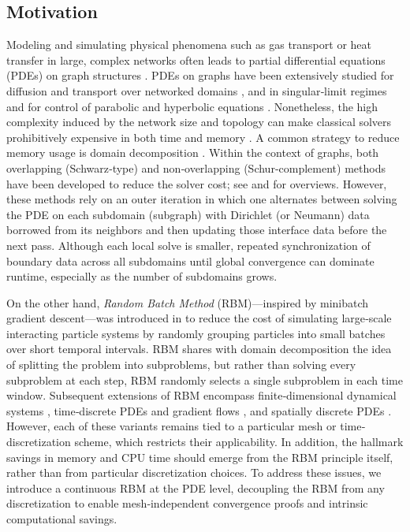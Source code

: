 \documentclass[10pt,a4paper]{amsart}
\begin{document}
\subsection{Motivation}
Modeling and simulating physical phenomena such as gas transport or heat transfer in large, complex networks often leads to partial differential equations (PDEs) on graph structures \cite{MR3728372,Leuge,Mugnolo,wad1}. PDEs on graphs have been extensively studied for diffusion and transport over networked domains \cite{Leuge,Mugnolo,wad1,wad3,MR2818413}, and in singular‐limit regimes \cite{Egger,barcena2025control} and for control of parabolic and hyperbolic equations \cite{MR4421539,MR4581791,dager2006wave}. Nonetheless, the high complexity induced by the network size and topology can make classical solvers prohibitively expensive in both time and memory \cite{MR4175147}. A common strategy to reduce memory usage is domain decomposition \cite{MR2093789}. Within the context of graphs, both overlapping (Schwarz‐type) and non‐overlapping (Schur‐complement) methods have been developed to reduce the solver cost; see \cite[Chapter III]{MR2093789} and \cite{MR1857663} for overviews.  However, these methods rely on an outer iteration in which one alternates between solving the PDE on each subdomain (subgraph) with Dirichlet (or Neumann) data borrowed from its neighbors and then updating those interface data before the next pass. Although each local solve is smaller, repeated synchronization of boundary data across all subdomains until global convergence can dominate runtime, especially as the number of subdomains grows.


On the other hand, \emph{Random Batch Method} (RBM)—inspired by minibatch gradient descent—was introduced in \cite{ShietalRBM,MR4230431} to reduce the cost of simulating large‐scale interacting particle systems by randomly grouping particles into small batches over short temporal intervals. RBM shares with domain decomposition the idea of splitting the problem into subproblems, but rather than solving every subproblem at each step, RBM randomly selects a single subproblem in each time window. Subsequent extensions of RBM encompass finite‐dimensional dynamical systems \cite{MR4433122,MR4307003,veldman2023stability}, time‐discrete PDEs and gradient flows \cite{eisenmann2022randomized,Corella_hernandez2025}, and spatially discrete PDEs \cite{firstpaper}. However, each of these variants remains tied to a particular mesh or time‐discretization scheme, which restricts their applicability. In addition, the hallmark savings in memory and CPU time should emerge from the RBM principle itself, rather than from particular discretization choices. To address these issues, we introduce a continuous RBM at the PDE level, decoupling the RBM from any discretization to enable mesh‐independent convergence proofs and intrinsic computational savings.
\end{document}
